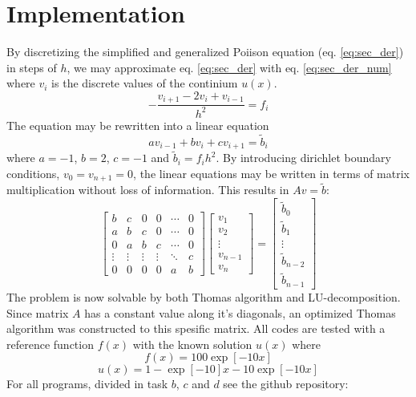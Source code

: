\documentclass[twoside,twocolumn]{article}
\begin{document}
\section{Implementation}
By discretizing the simplified and generalized Poiison equation (eq. \ref{eq:sec_der}) in steps of $h$, we may approximate eq. \ref{eq:sec_der} with eq. \ref{eq:sec_der_num} where $v_i$ is the discrete values of the continium $u(x)$.
\begin{equation}
-\frac{v_{i+1}-2v_i+v_{i-1}}{h^2}=f_i \label{eq:sec_der_num}
\end{equation}
The equation may be rewritten into a linear equation
\begin{equation*}
av_{i-1}+bv_i+cv_{i+1}=\tilde{b}_i 
\end{equation*}
where $a=-1$, $b=2$, $c=-1$ and $\tilde{b}_i=f_ih^2$. By introducing dirichlet boundary conditions, $v_0=v_{n+1}=0$, the linear equations may be written in terms of matrix multiplication without loss of information. This results in $Av=\tilde{b}$:
\begin{equation}
\begin{bmatrix}
b&c&0&0&\cdots &0\\
a&b&c&0& \cdots & 0\\
0&a&b&c& \cdots & 0\\
\vdots&\vdots&\vdots&\vdots&\ddots&c\\
0&0&0&0&a&b
\end{bmatrix}
\begin{bmatrix}
v_1\\v_2\\\vdots\\v_{n-1}\\v_{n}
\end{bmatrix}=
\begin{bmatrix}
\tilde{b}_0\\\tilde{b}_1\\\vdots\\\tilde{b}_{n-2}\\\tilde{b}_{n-1}
\end{bmatrix} \label{eq:problem}
\end{equation}
The problem is now solvable by both Thomas algorithm and LU-decomposition. Since matrix $A$ has a constant value along it's diagonals, an optimized Thomas algorithm was constructed to this spesific matrix. All codes are tested with a reference function $f(x)$ with the known solution $u(x)$ where
\begin{equation*}
f(x)=100\exp[-10x]
\end{equation*}
\begin{equation*}
u(x)=1-\exp[-10]x-10\exp[-10x]
\end{equation*}
For all programs, divided in task $b$, $c$ and $d$ see the github repository: 
\end{document}
